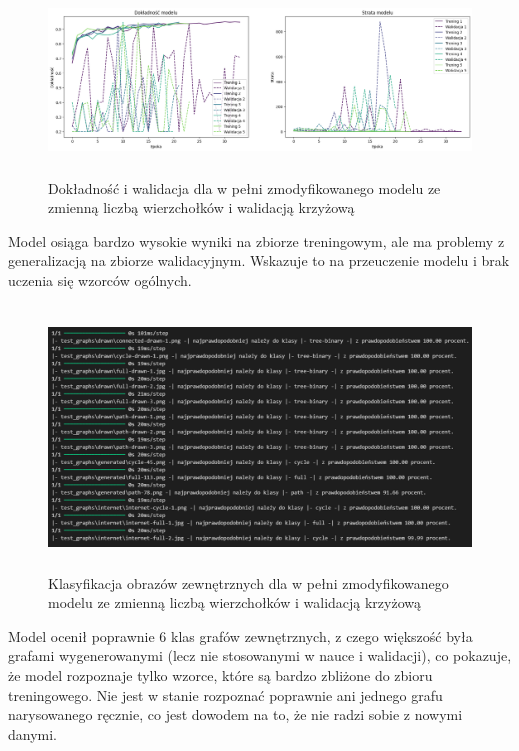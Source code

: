 \begin{figure}[ht]
	\centering
	\includegraphics[height=5cm]{resources/tests/images/v4/multiple_edges_crossvalid_img.png}
	\caption{Dokładność i walidacja dla w pełni zmodyfikowanego modelu ze zmienną liczbą wierzchołków i walidacją krzyżową}
	\label{Fig:tests-var-2}
\end{figure}
\FloatBarrier

Model osiąga bardzo wysokie wyniki na zbiorze treningowym,
ale ma problemy z generalizacją na zbiorze walidacyjnym.
Wskazuje to na przeuczenie modelu i brak uczenia się wzorców ogólnych.

\begin{figure}[ht]
	\centering
	\includegraphics[height=7cm]{resources/tests/images/v4/multiple_edges_crossvalid_txt.png}
	\caption{Klasyfikacja obrazów zewnętrznych dla w pełni zmodyfikowanego modelu ze zmienną liczbą wierzchołków i walidacją krzyżową}
	\label{Fig:tests-var-2}
\end{figure}
\FloatBarrier

Model ocenił poprawnie 6 klas grafów zewnętrznych, z czego większość była grafami wygenerowanymi
(lecz nie stosowanymi w nauce i walidacji), co pokazuje, że model rozpoznaje tylko wzorce,
które są bardzo zbliżone do zbioru treningowego.
Nie jest w stanie rozpoznać poprawnie ani jednego grafu narysowanego ręcznie,
co jest dowodem na to, że nie radzi sobie z nowymi danymi.